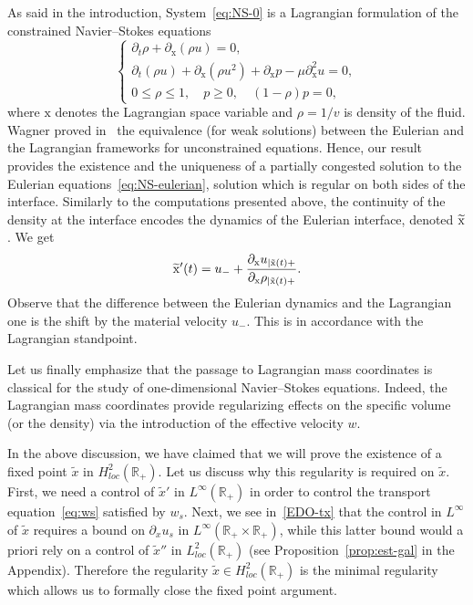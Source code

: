 \documentclass[AHL,Unicode,longabstracts,published]{cedram}
\newcommand{\R}{\mathbb{R}}
\newcommand{\x}{\mathrm{x}}
\newcommand{\tx}{\widetilde{x}}
\let\oldtilde\tilde
\renewcommand*{\tilde}[1]{\mathchoice{\widetilde{#1}}{\widetilde{#1}}{\oldtilde{#1}}{\oldtilde{#1}}}
\newcommand{\tx}{\widetilde{x}}
\begin{document}
\begin{rema}
As said in the introduction, System~\eqref{eq:NS-0} is a Lagrangian formulation of the constrained Navier--Stokes equations
\begin{equation}\label{eq:NS-eulerian}
\begin{cases}
\partial_t \rho + \partial_\x (\rho u) = 0, \\
\partial_t(\rho u) + \partial_\x (\rho u^2) + \partial_\x p - \mu \partial^2_\x u = 0, \\
0 \leq \rho \leq 1, \quad p \geq 0, \quad (1-\rho)p= 0,
\end{cases}
\end{equation}
where $\x$ denotes the Lagrangian space variable and $\rho = 1/v$ is density of the fluid. Wagner proved in~\cite{wagner1987} the equivalence (for weak solutions) between the Eulerian and the Lagrangian frameworks for unconstrained equations. Hence, our result provides the existence and the uniqueness of a partially congested solution to the Eulerian equations~\eqref{eq:NS-eulerian}, solution which is regular on both sides of the interface. Similarly to the computations presented above, the continuity of the density at the interface encodes the dynamics of the Eulerian interface, denoted $\tilde \x$. We get
\[
\tilde \x' (t) = u_- + \dfrac{\partial_\x u_{|\tilde \x(t) +}}{\partial_\x \rho_{|\tilde \x(t) +}}.
\]
Observe that the difference between the Eulerian dynamics and the Lagrangian one is the shift by the material velocity $u_-$. This is in accordance with the Lagrangian standpoint.


Let us finally emphasize that the passage to Lagrangian mass coordinates is classical for the study of one-dimensional Navier--Stokes equations. Indeed, the Lagrangian mass coordinates provide regularizing effects on the specific volume (or the density) via the introduction of the effective velocity $w$.
\end{rema}





\begin{rema}[About the regularity of $\tx$]
In the above discussion, we have claimed that we will prove the existence of a fixed point $\tx$ in $H^2_{loc}(\R_+)$. Let us discuss why this regularity is required on $\tx$. First, we need a control of $\tx'$ in $L^\infty(\R_+)$ in order to control the transport equation~\eqref{eq:ws} satisfied by $w_s$. Next, we see in~\eqref{EDO-tx} that the control in $L^\infty$ of $\tx$ requires a bound on $\partial_x u_s$ in $L^\infty(\R_+ \times \R_+)$, while this latter bound would a priori rely on a control of $\tx''$ in $L^2_{loc}(\R_+)$ (see Proposition~\ref{prop:est-gal} in the Appendix). Therefore the regularity $\tx \in H^2_{loc}(\R_+)$ is the minimal regularity which allows us to formally close the fixed point argument.
\end{rema}
\end{document}
